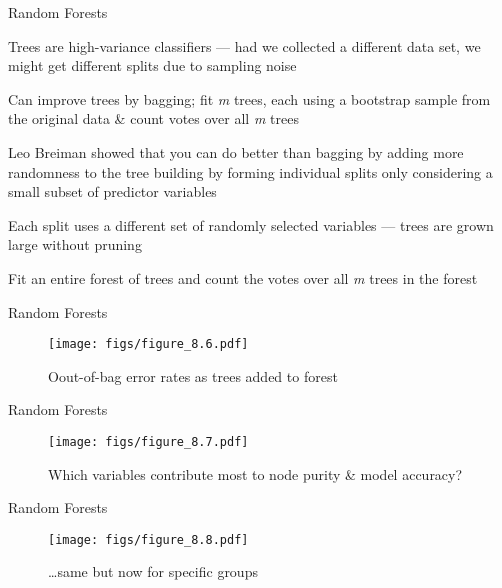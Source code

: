 \documentclass[11pt,ignorenonframetext,compress, aspectratio=169]{beamer}
\begin{document}
\begin{frame}{Random Forests}

Trees are high-variance classifiers --- had we collected a different
data set, we might get different splits due to sampling noise

Can improve trees by \alert{bagging}; fit \emph{m} trees, each using a
bootstrap sample from the original data \& count votes over all \emph{m}
trees

Leo Breiman showed that you can do better than bagging by adding more
randomness to the tree building by forming individual splits only
considering a small subset of predictor variables

Each split uses a different set of randomly selected variables --- trees
are grown large without pruning

Fit an entire forest of trees and count the votes over all \emph{m}
trees in the forest

\end{frame}

\begin{frame}{Random Forests}

\begin{figure}[htbp]
\centering
\texttt{[image: figs/figure\_8.6.pdf]}
\caption{Oout-of-bag error rates as trees added to forest}
\end{figure}

\end{frame}

\begin{frame}{Random Forests}

\begin{figure}[htbp]
\centering
\texttt{[image: figs/figure\_8.7.pdf]}
\caption{Which variables contribute most to node purity \& model
accuracy?}
\end{figure}

\end{frame}

\begin{frame}{Random Forests}

\begin{figure}[htbp]
\centering
\texttt{[image: figs/figure\_8.8.pdf]}
\caption{\ldots{}same but now for specific groups}
\end{figure}

\end{frame}
\end{document}
